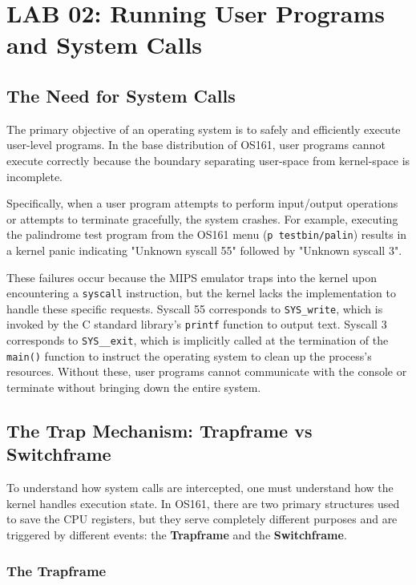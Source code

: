 \chapter{LAB 02: Running User Programs and System Calls}

\section{The Need for System Calls}
The primary objective of an operating system is to safely and efficiently execute user-level programs. In the base distribution of OS161, user programs cannot execute correctly because the boundary separating user-space from kernel-space is incomplete. 

Specifically, when a user program attempts to perform input/output operations or attempts to terminate gracefully, the system crashes. For example, executing the palindrome test program from the OS161 menu (\texttt{p testbin/palin}) results in a kernel panic indicating "Unknown syscall 55" followed by "Unknown syscall 3". 

These failures occur because the MIPS emulator traps into the kernel upon encountering a \texttt{syscall} instruction, but the kernel lacks the implementation to handle these specific requests. Syscall 55 corresponds to \texttt{SYS\_write}, which is invoked by the C standard library's \texttt{printf} function to output text. Syscall 3 corresponds to \texttt{SYS\_\_exit}, which is implicitly called at the termination of the \texttt{main()} function to instruct the operating system to clean up the process's resources. Without these, user programs cannot communicate with the console or terminate without bringing down the entire system.

\section{The Trap Mechanism: Trapframe vs Switchframe}
To understand how system calls are intercepted, one must understand how the kernel handles execution state. In OS161, there are two primary structures used to save the CPU registers, but they serve completely different purposes and are triggered by different events: the \textbf{Trapframe} and the \textbf{Switchframe}.

\subsection{The Trapframe}


